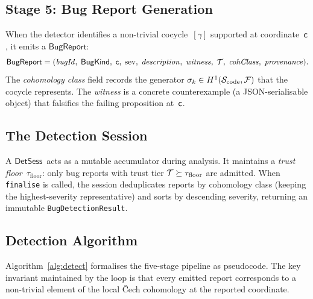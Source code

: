 \documentclass[11pt]{article}
\newcommand{\BugKind}{\ensuremath{\mathsf{BugKind}}}          %
\newcommand{\BugRep}{\ensuremath{\mathsf{BugReport}}}          %
\newcommand{\SemSite}{\mathcal{S}_{\mathrm{code}}}%
\newcommand{\DetSess}{\ensuremath{\mathsf{DetSess}}}           %
\newcommand{\SevScore}{\mathrm{sev}}              %
\newcommand{\tgeq}{\succeq}                         %
\begin{document}
\subsection{Stage 5: Bug Report Generation}

When the detector identifies a non-trivial cocycle~$[\gamma]$ supported
at coordinate~$\mathsf{c}$, it emits a \BugRep:
\[
  \BugRep = (\mathit{bugId},\;\BugKind,\;\coord,\;\SevScore,\;
             \mathit{description},\;\mathit{witness},\;\trust,\;
             \mathit{cohClass},\;\mathit{provenance}).
\]
The \emph{cohomology class} field records the generator
$\sigma_k \in \Hcoh{1}(\SemSite,\mathcal{F})$ that the cocycle represents.
The \emph{witness} is a concrete counterexample (a JSON-serialisable object)
that falsifies the failing proposition at~$\mathsf{c}$.

\subsection{The Detection Session}

A \DetSess\ acts as a mutable accumulator during analysis.  It maintains
a \emph{trust floor}~$\tau_\mathrm{floor}$: only bug reports with trust
tier $\trust \tgeq \tau_\mathrm{floor}$ are admitted.  When
\texttt{finalise} is called, the session deduplicates reports by cohomology
class (keeping the highest-severity representative) and sorts by descending
severity, returning an immutable \texttt{BugDetectionResult}.

\subsection{Detection Algorithm}\label{subsec:detection-alg}

Algorithm~\ref{alg:detect} formalises the five-stage pipeline as
pseudocode.  The key invariant maintained by the loop is that every
emitted report corresponds to a non-trivial element of the local
\v{C}ech cohomology at the reported coordinate.
\end{document}
